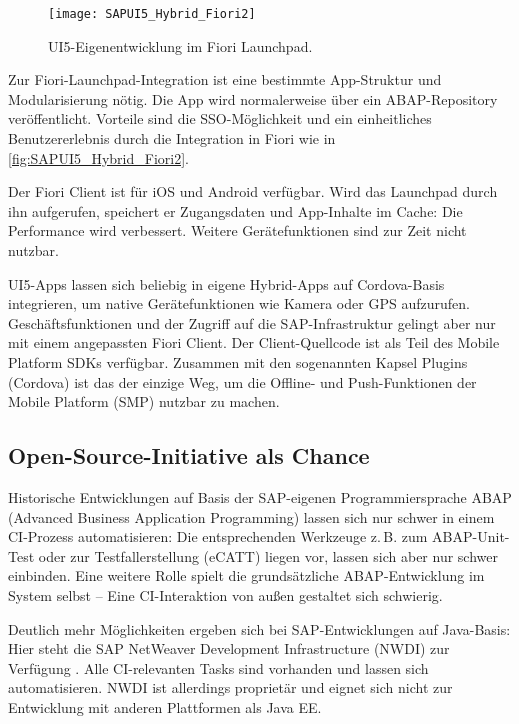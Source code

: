 \begin{figure}[b]
	\centering
	\texttt{[image: SAPUI5\_Hybrid\_Fiori2]} 
	\caption[UI5-Eigenentwicklung im Fiori Launchpad]{UI5-Eigenentwicklung im Fiori Launchpad.}
	\label{fig:SAPUI5_Hybrid_Fiori2}
\end{figure}

Zur Fiori-Launchpad-Integration ist eine bestimmte App-Struktur und Modularisierung nötig. Die App wird normalerweise über ein ABAP-Reposit\-ory veröffentlicht. Vorteile sind die SSO-Möglichkeit und ein einheitliches Benutzererlebnis durch die Integration in Fiori wie in \autoref{fig:SAPUI5_Hybrid_Fiori2}.

Der Fiori Client ist für iOS und Android verfügbar. Wird das Launchpad durch ihn aufgerufen, speichert er Zugangsdaten und App-Inhalte im Cache: Die Performance wird verbessert. Weitere Gerätefunktionen sind zur Zeit nicht nutzbar.

UI5-Apps lassen sich beliebig in eigene Hybrid-Apps auf Cordova-Basis integrieren, um native Gerätefunktionen wie Kamera oder GPS aufzurufen. Geschäftsfunktionen und der Zugriff auf die SAP-Infrastruktur gelingt aber nur mit einem angepassten Fiori Client. Der Client-Quellcode ist als Teil des Mobile Platform SDKs verfügbar. Zusammen mit den sogenannten Kapsel Plugins (Cordova) ist das der einzige Weg, um die Offline- und Push-Funktionen der Mobile Platform (SMP) nutzbar zu machen.

\subsection{Open-Source-Initiative als Chance}
\label{sec:os_chance}
Historische Entwicklungen auf Basis der SAP-eigenen Programmiersprache ABAP
(Advanced Business Application Programming) lassen sich nur schwer in einem
CI-Prozess automatisieren: Die entsprechenden Werkzeuge z.\,B. zum
ABAP-Unit-Test \cite{Majer2009} oder zur Testfallerstellung (eCATT) liegen vor,
lassen sich aber nur schwer einbinden. Eine weitere Rolle spielt die
grundsätzliche ABAP-Entwicklung im System selbst -- Eine CI-Interaktion von
außen gestaltet sich schwierig.

Deutlich mehr Möglichkeiten ergeben sich bei SAP-Entwicklungen auf Java-Basis:
Hier steht die SAP NetWeaver Development Infrastructure (NWDI) zur Verfügung
\cite{Chan2011}.
Alle CI-relevanten Tasks sind vorhanden und lassen sich automatisieren.
NWDI ist allerdings proprietär und eignet sich nicht zur Entwicklung mit anderen
Plattformen als Java EE.

